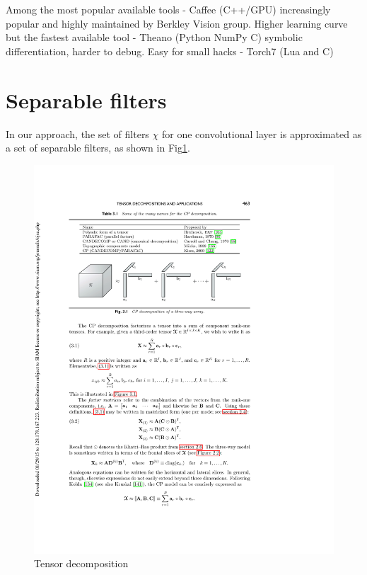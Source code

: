 \documentclass{article} %
\begin{document}
 Among the most popular available tools
 - Caffee (C++/GPU) increasingly popular and highly maintained by Berkley Vision group. Higher learning curve but the fastest available tool
 - Theano (Python NumPy C) symbolic differentiation, harder to debug.
 	Easy for small hacks
 - Torch7 (Lua and C) 

\section{Separable filters}
In our approach, the set of filters $\chi$ for one convolutional layer is approximated as
a set of separable filters, as shown in Fig\ref{fig:decomposition}.
\begin{figure}[h]
  \centering
   \includegraphics[width=\textwidth]{images/decomposable.pdf}
  \caption{Tensor decomposition}
  \label{fig:decomposition}
\end{figure}
\end{document}
